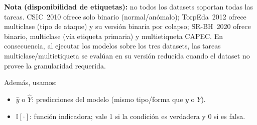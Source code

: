 \documentclass[12pt,oneside]{report}
\newcommand{\ind}{\mathbb{I}} %
\begin{document}
\noindent\textbf{Nota (disponibilidad de etiquetas):} no todos los datasets soportan todas las tareas. CSIC~2010 ofrece solo binario (normal/anómalo); TorpEda~2012 ofrece multiclase (tipo de ataque) y su versión binaria por colapso; SR-BH~2020 ofrece binario, multiclase (vía etiqueta primaria) y multietiqueta CAPEC. En consecuencia, al ejecutar los modelos sobre los tres datasets, las tareas multiclase/multietiqueta se evalúan en su versión reducida cuando el dataset no provee la granularidad requerida.

Además, usamos:

\begin{itemize}[leftmargin=*]
  \item $\hat{y}$ o $\hat{Y}$: predicciones del modelo (mismo tipo/forma que $y$ o $Y$).
  \item $\ind[\cdot]$: función indicadora; vale 1 si la condición es verdadera y 0 si es falsa.
\end{itemize}
\end{document}
